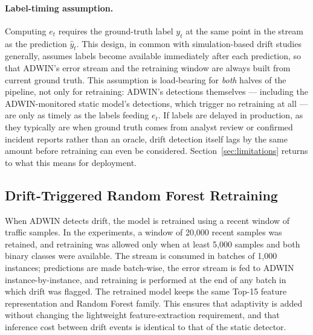\documentclass[11pt,a4paper]{article}
\begin{document}
\paragraph{Label-timing assumption.} Computing $e_t$ requires the
ground-truth label $y_t$ at the same point in the stream as the
prediction $\hat{y}_t$. This design, in common with simulation-based
drift studies generally, assumes labels become available immediately
after each prediction, so that ADWIN's error stream and the retraining
window are always built from current ground truth. This assumption is
load-bearing for \emph{both} halves of the pipeline, not only for
retraining: ADWIN's detections themselves --- including the
ADWIN-monitored static model's detections, which trigger no retraining
at all --- are only as timely as the labels feeding $e_t$. If labels
are delayed in production, as they typically are when ground truth
comes from analyst review or confirmed incident reports rather than an
oracle, drift detection itself lags by the same amount before
retraining can even be considered. Section~\ref{sec:limitations}
returns to what this means for deployment.

\subsection{Drift-Triggered Random Forest Retraining}

When ADWIN detects drift, the model is retrained using a recent window
of traffic samples. In the experiments, a window of 20{,}000 recent
samples was retained, and retraining was allowed only when at least
5{,}000 samples and both binary classes were available. The stream is
consumed in batches of 1{,}000 instances; predictions are made
batch-wise, the error stream is fed to ADWIN instance-by-instance, and
retraining is performed at the end of any batch in which drift was
flagged. The retrained model keeps the same Top-15 feature
representation and Random Forest family. This ensures that adaptivity is
added without changing the lightweight feature-extraction requirement,
and that inference cost between drift events is identical to that of the
static detector.
\end{document}
